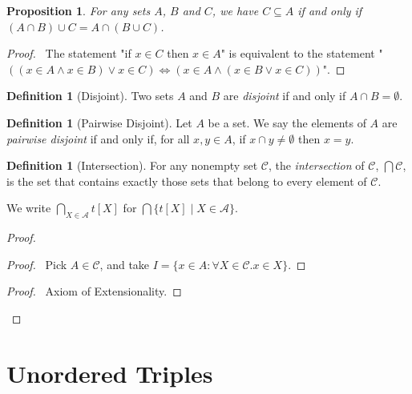 \documentclass{report}
\let\qed\relax
\newtheorem{prop}[ax]{Proposition}
\theoremstyle{definition}
\newtheorem{df}[ax]{Definition}
\begin{document}
\begin{prop}
For any sets $A$, $B$ and $C$, we have $C \subseteq A$ if and only if $(A \cap B) \cup C = A \cap (B \cup C)$.
\end{prop}

\begin{proof}
\pf\ The statement "if $x \in C$ then $x \in A$" is equivalent to the statement "$((x \in A \wedge x \in B) \vee x \in C) \Leftrightarrow (x \in A \wedge (x \in B \vee x \in C))$". \qed
\end{proof}

\begin{df}[Disjoint]
Two sets $A$ and $B$ are \emph{disjoint} if and only if $A \cap B = \emptyset$.
\end{df}

\begin{df}[Pairwise Disjoint]
Let $A$ be a set. We say the elements of $A$ are \emph{pairwise disjoint} if and only if, for all $x, y \in A$, if $x \cap y \neq \emptyset$ then $x = y$.
\end{df}

\begin{df}[Intersection]
For any nonempty set $\mathcal{C}$, the \emph{intersection} of $\mathcal{C}$, $\bigcap \mathcal{C}$, is the set that contains exactly those sets that belong to every element of $\mathcal{C}$.

We write $\bigcap_{X \in \mathcal{A}} t[X]$ for $\bigcap \{t[X] \mid X \in \mathcal{A} \}$.
\end{df}

\begin{proof}
\pf
{}
\begin{proof}
	\pf\ Pick $A \in \mathcal{C}$, and take $I = \{ x \in A : \forall X \in \mathcal{C}. x \in X \}$.
\end{proof}
\begin{proof}
	\pf\ Axiom of Extensionality.
\end{proof}
\qed
\end{proof}

\chapter{Unordered Triples}
\end{document}
